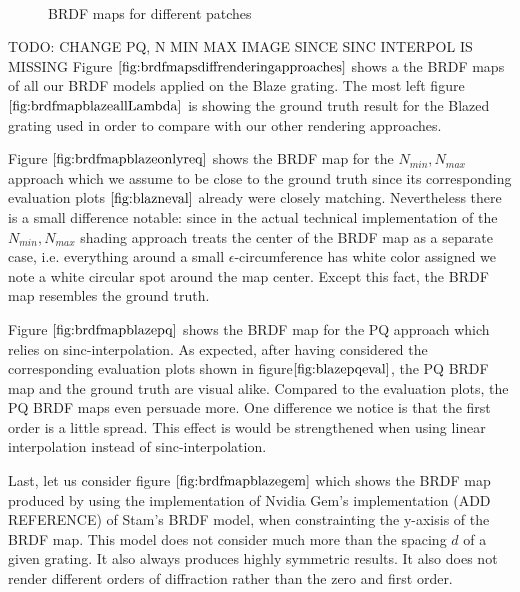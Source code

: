 \begin{figure}[H]
  \centering
~
~

\caption[BRDF Map FLSS of our Gratings]{BRDF maps for different patches}
\label{fig:brdfmapsdiffpatches}
\end{figure}

TODO:  CHANGE PQ, N MIN MAX IMAGE SINCE SINC INTERPOL IS MISSING
Figure $\ref{fig:brdfmapsdiffrenderingapproaches}$ shows a the BRDF maps of all our BRDF models applied on the Blaze grating. The most left figure $\ref{fig:brdfmapblazeallLambda}$ is showing the ground truth result for the Blazed grating used in order to compare with our other rendering approaches.

Figure $\ref{fig:brdfmapblazeonlyreq}$ shows the BRDF map for the $N_{min}, N_{max}$ approach which we assume to be close to the ground truth since its corresponding evaluation plots $\ref{fig:blazneval}$ already were closely matching. Nevertheless there is a small difference notable: since in the actual technical implementation of the $N_{min}, N_{max}$ shading approach treats the center of the BRDF map as a separate case, i.e. everything around a small $\epsilon$-circumference has white color assigned 
we note a white circular spot around the map center. Except this fact, the BRDF map resembles the ground truth.

Figure $\ref{fig:brdfmapblazepq}$ shows the BRDF map for the PQ approach which relies on sinc-interpolation. As expected, after having considered the corresponding evaluation plots shown in figure$\ref{fig:blazepqeval}$, the PQ BRDF map and the ground truth are visual alike. Compared to the evaluation plots, the PQ BRDF maps even persuade more. One difference we notice is that the first order is a little spread. This effect is would be strengthened when using linear interpolation instead of sinc-interpolation.

Last, let us consider figure $\ref{fig:brdfmapblazegem}$ which shows the BRDF map produced by using the implementation of Nvidia Gem's implementation (ADD REFERENCE) of Stam's BRDF model, when constrainting the y-axisis of the BRDF map. This model does not consider much more than the spacing $d$ of a given grating. It also always produces highly symmetric results. It also does not render different orders of diffraction rather than the zero and first order.   

